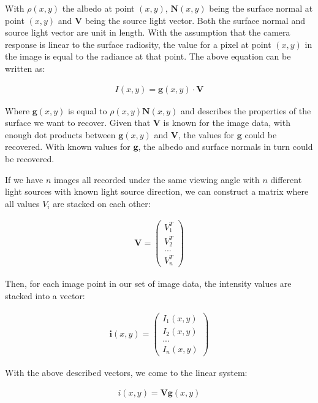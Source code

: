 \noindent With $\rho(x,y)$ the albedo at point $(x,y)$, $\textbf{N}(x,y)$ being the surface normal at point $(x,y)$ and $\textbf{V}$ being the source light vector. Both the surface normal and source light vector are unit in length. With the assumption that the camera response is linear to the surface radiosity, the value for a pixel at point $(x,y)$ in the image is equal to the radiance at that point. The above equation can be written as:

	\begin{eqnarray*}
		I(x,y) =  \textbf{g}(x,y) \cdot \textbf{V}
	\end{eqnarray*}

\noindent Where $\textbf{g}(x,y)$ is equal to $\rho(x,y)\textbf{N}(x,y)$ and describes the properties of the surface we want to recover. Given that $\textbf{V}$ is known for the image data, with enough dot products between $\textbf{g}(x,y)$ and $\textbf{V}$, the values for $\textbf{g}$ could be recovered. With known values for $\textbf{g}$, the albedo and surface normals in turn could be recovered.

If we have $n$ images all recorded under the same viewing angle with $n$ different light sources with known light source direction, we can construct a matrix where all values $V_i$ are stacked on each other:

	\begin{eqnarray*}
		\textbf{V} = \begin{pmatrix} V_1^T \\ V_2^T \\ ... \\ V_n^T \end{pmatrix}
	\end{eqnarray*}

\noindent Then, for each image point in our set of image data, the intensity values are stacked into a vector:

	\begin{eqnarray*}
		\textbf{i}(x,y) = \begin{pmatrix} I_1(x,y) \\ I_2(x,y) \\ ... \\ I_n(x,y) \end{pmatrix}
	\end{eqnarray*}

\noindent With the above described vectors, we come to the linear system:

	\begin{eqnarray*}
		i(x,y) = \textbf{V}\textbf{g}(x,y)
	\end{eqnarray*}

